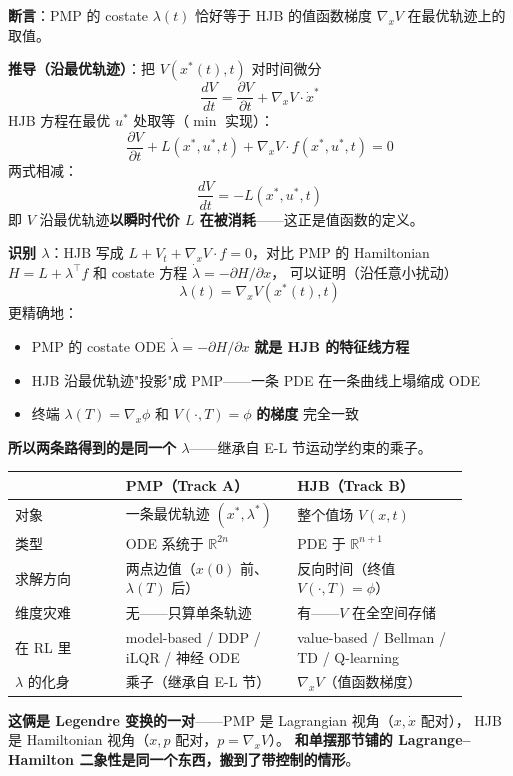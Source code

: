 \documentclass[12pt, a4paper]{ctexart}
\begin{document}
\begin{blackboard}[桥接：$\lambda(t) = \nabla_x V(x^*(t), t)$]

\textbf{断言}：PMP 的 costate $\lambda(t)$ 恰好等于 HJB 的值函数梯度 $\nabla_x V$ 在最优轨迹上的取值。

\textbf{推导（沿最优轨迹）}：把 $V(x^*(t), t)$ 对时间微分
\[
\frac{dV}{dt} = \frac{\partial V}{\partial t} + \nabla_x V \cdot \dot x^*
\]
HJB 方程在最优 $u^*$ 处取等（$\min$ 实现）：
\[
\frac{\partial V}{\partial t} + L(x^*, u^*, t) + \nabla_x V \cdot f(x^*, u^*, t) = 0
\]
两式相减：
\[
\frac{dV}{dt} = -L(x^*, u^*, t)
\]
即 $V$ 沿最优轨迹\textbf{以瞬时代价 $L$ 在被消耗}——这正是值函数的定义。

\textbf{识别 $\lambda$}：HJB 写成 $L + V_t + \nabla_x V\cdot f = 0$，对比 PMP 的 Hamiltonian
$H = L + \lambda^\top f$ 和 costate 方程 $\dot\lambda = -\partial H/\partial x$，
可以证明（沿任意小扰动）
\[
\boxed{\;\lambda(t) = \nabla_x V(x^*(t), t)\;}
\]
更精确地：
\begin{itemize}
    \item PMP 的 costate ODE $\dot\lambda = -\partial H/\partial x$ \textbf{就是 HJB 的特征线方程}
    \item HJB 沿最优轨迹"投影"成 PMP——一条 PDE 在一条曲线上塌缩成 ODE
    \item 终端 $\lambda(T) = \nabla_x\phi$ 和 $V(\cdot, T) = \phi$ \textbf{的梯度} 完全一致
\end{itemize}

\textbf{所以两条路得到的是同一个 $\lambda$}——继承自 E-L 节运动学约束的乘子。

\end{blackboard}

\begin{keypoint}

\renewcommand{\arraystretch}{1.2}
\begin{tabular}{p{0.22\linewidth}|p{0.34\linewidth}|p{0.34\linewidth}}
\toprule
 & \textbf{PMP（Track A）} & \textbf{HJB（Track B）} \\
\midrule
对象 & 一条最优轨迹 $(x^*, \lambda^*)$ & 整个值场 $V(x, t)$ \\
\midrule
类型 & ODE 系统于 $\mathbb{R}^{2n}$ & PDE 于 $\mathbb{R}^{n+1}$ \\
\midrule
求解方向 & 两点边值（$x(0)$ 前、$\lambda(T)$ 后） & 反向时间（终值 $V(\cdot,T)=\phi$） \\
\midrule
维度灾难 & 无——只算单条轨迹 & 有——$V$ 在全空间存储 \\
\midrule
在 RL 里 & model-based / DDP / iLQR / 神经 ODE & value-based / Bellman / TD / Q-learning \\
\midrule
$\lambda$ 的化身 & 乘子（继承自 E-L 节） & $\nabla_x V$（值函数梯度） \\
\bottomrule
\end{tabular}

\vspace{0.3em}
\textbf{这俩是 Legendre 变换的一对}——PMP 是 Lagrangian 视角（$x, \dot x$ 配对），
HJB 是 Hamiltonian 视角（$x, p$ 配对，$p = \nabla_x V$）。
\textbf{和单摆那节铺的 Lagrange–Hamilton 二象性是同一个东西，搬到了带控制的情形}。

\end{keypoint}
\end{document}
